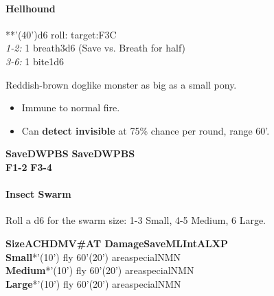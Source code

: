 \documentclass[english,11pt,openany,letterpaper,twocolumn]{book}
\begin{document}
\skipline\skipline
\hypertarget{hellhound}{}
\paragraph{Hellhound}
**'(40')\tab d6 roll: target:\tab F3\tab C
\\\textit{1-2:} 1 breath\tab 3d6 (Save vs. Breath for half)
\\\textit{3-6:} 1 bite1d6

Reddish-brown doglike monster as big as a small pony.
\begin{itemize}[leftmargin=*,label=\itshape\textbullet]
\item
Immune to normal fire.
\item
Can \textbf{detect invisible} at 75\% chance per round, range 60'.
\end{itemize}


\vfill


\tab
\overprintw[24\charwidth]{\_}%
\textbf{Save\tab D\tab W\tab P\tab B\tab S}\tab
\overprintw[24\charwidth]{\_}%
\textbf{Save\tab D\tab W\tab P\tab B\tab S}\\
\tab\textbf{F1-2}
\tab\textbf{F3-4}

\break


\hypertarget{swarm}{}
\paragraph{Insect Swarm}

Roll a d6 for the swarm size: 1-3 Small, 4-5 Medium, 6 Large.

%

\ulf\textbf{Size\tab AC\tab HD\tab MV\tab \#AT \tab Damage\tab Save\tab ML\tab Int\tab AL\tab XP}\\%
\textbf{Small}*'(10') fly 60'(20') area\tab special\tab NM\tab N\\%
\textbf{Medium}*'(10') fly 60'(20') area\tab special\tab NM\tab N\\%
\ulf\textbf{Large}*'(10') fly 60'(20') area\tab special\tab NM\tab N\\%
\end{document}
